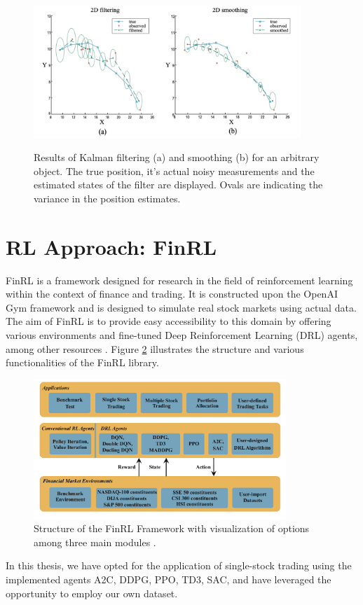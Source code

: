 \documentclass[12pt]{article}
\begin{document}
\begin{figure}[h]
\centering
\includegraphics[width=0.9\textwidth]{figs/plotKalman.png}   \\
\caption{Results of Kalman filtering (a) and smoothing (b) for an arbitrary  object. The true position, it's actual noisy measurements and the estimated states of the filter are displayed. Ovals are indicating the variance in the position estimates. \cite[p. 502]{Russell2021}}
\label{fig:finalnw}
\end{figure}




\section{RL Approach: FinRL}
\label{subsec:FinRl}
FinRL is a framework designed for research in the field of reinforcement learning within the context of finance and trading. It is constructed upon the OpenAI Gym framework and is designed to simulate real stock markets using actual data. The aim of FinRL is to provide easy accessibility to this domain by offering various environments and fine-tuned Deep Reinforcement Learning (DRL) agents, among other resources \cite{liu2020finrl}.
Figure \ref{fig:FinRL-structure} illustrates the structure and various functionalities of the FinRL library.
\begin{figure}[h]
    \centering
    \includegraphics[width=0.85\textwidth]{figs/FinRl_structure2.pdf}
    \caption{Structure of the FinRL Framework with visualization of options among three main modules \cite{liu2020finrl}.}
    \label{fig:FinRL-structure}
\end{figure}
In this thesis, we have opted for the application of single-stock trading using the implemented agents A2C, DDPG, PPO, TD3, SAC, and have leveraged the opportunity to employ our own dataset.
\end{document}
